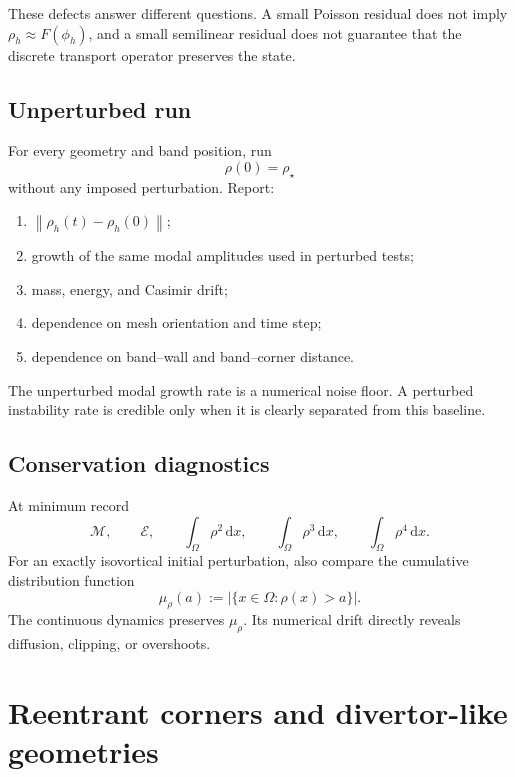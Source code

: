 \documentclass[11pt,a4paper]{article}
\newcommand{\Om}{\Omega}
\newcommand{\dd}{\,\mathrm{d}}
\newcommand{\norm}[1]{\left\|#1\right\|}
\newcommand{\abs}[1]{\left|#1\right|}
\begin{document}
These defects answer different questions. A small Poisson residual does not imply $\rho_h\approx F(\phi_h)$, and a small semilinear residual does not guarantee that the discrete transport operator preserves the state.

\subsection{Unperturbed run}

For every geometry and band position, run
\begin{equation}
  \rho(0)=\rho_\star
  \label{eq:unperturbed-initial}
\end{equation}
without any imposed perturbation. Report:
\begin{enumerate}
  \item $\norm{\rho_h(t)-\rho_h(0)}$;
  \item growth of the same modal amplitudes used in perturbed tests;
  \item mass, energy, and Casimir drift;
  \item dependence on mesh orientation and time step;
  \item dependence on band--wall and band--corner distance.
\end{enumerate}
The unperturbed modal growth rate is a numerical noise floor. A perturbed instability rate is credible only when it is clearly separated from this baseline.

\subsection{Conservation diagnostics}

At minimum record
\begin{equation}
  \mathcal{M},\qquad
  \mathcal{E},\qquad
  \int_\Om\rho^2\dd x,\qquad
  \int_\Om\rho^3\dd x,\qquad
  \int_\Om\rho^4\dd x.
  \label{eq:minimal-invariants}
\end{equation}
For an exactly isovortical initial perturbation, also compare the cumulative distribution function
\begin{equation}
  \mu_\rho(a)
  :=\abs{\{x\in\Om:\rho(x)>a\}}.
  \label{eq:vorticity-distribution}
\end{equation}
The continuous dynamics preserves $\mu_\rho$. Its numerical drift directly reveals diffusion, clipping, or overshoots.

\section{Reentrant corners and divertor-like geometries}
\label{sec:corners}
\end{document}
